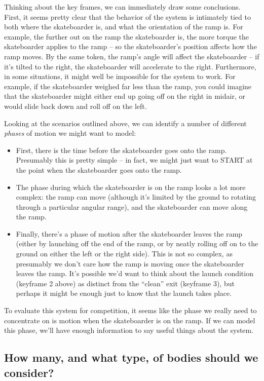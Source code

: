 \documentclass{tufte-handout}
\begin{document}
Thinking about the key frames, we can immediately draw some conclusions.  First, it seems pretty clear that the behavior of the system is intimately tied to both where the skateboarder is, and what the orientation of the ramp is.  For example, the further out on the ramp the skateboarder is, the more torque the skateboarder applies to the ramp -- so the skateboarder's position affects how the ramp moves.  By the same token, the ramp's angle will affect the skateboarder -- if it's tilted to the right, the skateboarder will accelerate to the right.  Furthermore, in some situations, it might well be impossible for the system to work.  For example, if the skateboarder weighed far less than the ramp, you could imagine that the skateboarder might either end up going off on the right in midair, or would slide back down and roll off on the left.

Looking at the scenarios outlined above, we can identify a number of different {\it phases} of motion we might want to model:   
\begin{itemize}
\item First, there is the time before the skateboarder goes onto the ramp.  Presumably this is pretty simple -- in fact, we might just want to START at the point when the skateboarder goes onto the ramp. \item The phase during which the skateboarder is on the ramp looks a lot more complex:  the ramp can move (although it's limited by the ground to rotating through a particular angular range), and the skateboarder can move along the ramp.  
\item Finally, there's a phase of motion after the skateboarder leaves the ramp (either by launching off the end of the ramp, or by neatly rolling off on to the ground on either the left or the right side).  This is not so complex, as presumably we don't care how the ramp is moving once the skateboarder leaves the ramp.  It's possible we'd want to think about the launch condition (keyframe 2 above) as distinct from the ``clean'' exit (keyframe 3), but  perhaps it might be enough just to know that the launch takes place.
\end{itemize}

To evaluate this system for competition, it seems like the phase we really need to concentrate on is  motion when the skateboarder is on the ramp.  If we can model this phase, we'll have enough information to say useful things about the system.

\subsection{How many, and what type, of bodies should we consider?}
\end{document}
